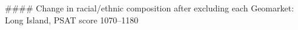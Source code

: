 #### Change in racial/ethnic composition after excluding each Geomarket: Long Island, PSAT score 1070–1180
